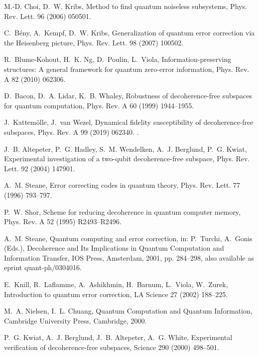 \documentclass[3p,sort&compress]{elsarticle}
\begin{document}
\begin{thebibliography}{100}
M.-D. Choi, D.~W. Kribs, Method to find quantum noiseless subsystems, Phys.
  Rev. Lett. 96 (2006) 050501.

C.~B{\'e}ny, A.~Kempf, D.~W. Kribs, Generalization of quantum error correction
  via the {H}eisenberg picture, Phys. Rev. Lett. 98 (2007) 100502.

R.~Blume-Kohout, H.~K. Ng, D.~Poulin, L.~Viola, Information-preserving
  structures: {A} general framework for quantum zero-error information, Phys.
  Rev. A 82 (2010) 062306.

D.~Bacon, D.~A. Lidar, K.~B. Whaley, Robustness of decoherence-free subspaces
  for quantum computation, Phys. Rev. A 60 (1999) 1944--1955.

J.~Kattem\"olle, J.~van Wezel, Dynamical fidelity susceptibility of
  decoherence-free subspaces, Phys. Rev. A 99 (2019) 062340.
\newblock \href {http://dx.doi.org/10.1103/PhysRevA.99.062340}
  {}.

J.~B. Altepeter, P.~G. Hadley, S.~M. Wendelken, A.~J. Berglund, P.~G. Kwiat,
  Experimental investigation of a two-qubit decoherence-free subspace, Phys.
  Rev. Lett. 92 (2004) 147901.

A.~M. Steane, Error correcting codes in quantum theory, Phys. Rev. Lett. 77
  (1996) 793--797.

P.~W. Shor, Scheme for reducing decoherence in quantum computer memory, Phys.
  Rev. A 52 (1995) R2493--R2496.

A.~M. Steane, Quantum computing and error correction, in: P.~Turchi, A.~Gonis
  (Eds.), Decoherence and Its Implications in Quantum Computation and
  Information Transfer, IOS Press, Amsterdam, 2001, pp. 284--298, also
  available as eprint quant-ph/0304016.

E.~Knill, R.~Laflamme, A.~Ashikhmin, H.~Barnum, L.~Viola, W.~Zurek,
  Introduction to quantum error correction, LA Science 27 (2002) 188--225.

M.~A. Nielsen, I.~L. Chuang, Quantum Computation and Quantum Information,
  Cambridge University Press, Cambridge, 2000.

P.~G. Kwiat, A.~J. Berglund, J.~B. Altepeter, A.~G. White, Experimental
  verification of decoherence-free subspaces, Science 290 (2000) 498--501.


\end{thebibliography}
\end{document}
